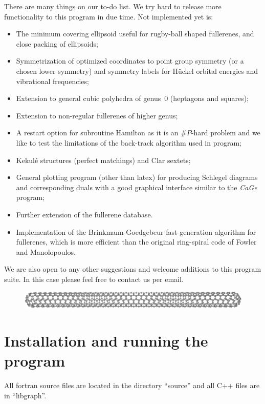 \documentclass[article,a4paper,twoside]{memoir}
\newcommand{\program}[1]{\textit{#1}}
\begin{document}
There are many things on our to-do list. We try hard to release more functionality to this program in due time.
Not implemented yet is: 

\begin{itemize}
\tightlist
\item The minimum covering ellipsoid useful for rugby-ball shaped fullerenes, and
close packing of ellipsoids;
\item Symmetrization of optimized coordinates to point group symmetry (or a chosen
lower symmetry) and symmetry labels for H\"uckel orbital energies and vibrational frequencies;
\item Extension to general cubic polyhedra of genus~0 (heptagons and squares); 
\item Extension to non-regular fullerenes of higher genus;
\item A restart option for subroutine Hamilton as it is an $\#P$-hard problem and
we like to test the limitations of the back-track algorithm used in program;  
\item Kekul\'e structures (perfect matchings) and Clar sextets;
\item General plotting program (other than latex) for producing Schlegel diagrams
and corresponding duals with a good graphical interface similar to the \program{CaGe} program;\cite{Brinkmanx}
\item Further extension of the fullerene database.
\item Implementation of the Brinkmann-Goedgebeur fast-generation algorithm for fullerenes,
which is more efficient than the original ring-spiral code of Fowler and Manolopoulos.
\end{itemize}

We are also open to any other suggestions and welcome additions to this program suite.
In this case please feel free to contact us per email.

 \begin{figure}[htbp]
   	\centering
  	\includegraphics[width=\textwidth]{C840.png}
 \end{figure} 
 
\clearpage
\section{Installation and running the program}
All fortran source files are located in the directory ``source'' and all C++ files are in ``libgraph''.
\end{document}
